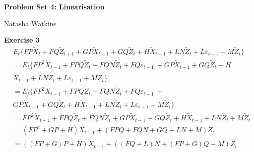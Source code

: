 \documentclass[letterpaper,12pt]{article}
\begin{document}
\textbf{\large Problem Set 4: Linearisation}

Natasha Watkins

\vspace{5mm}

\textbf{Exercise 3}
\begin{align*}
& E_t \Big\{ F P \tilde{X}_t + F Q \tilde{Z}_{t+1} + G P \tilde{X}_{t-1} + G Q \tilde{Z}_t + H \tilde{X}_{t-1} + L N \tilde{Z}_t + L \varepsilon_{t+1} + M \tilde{Z}_t \Big\} \\
&= E_t \Big\{ F P^2 \tilde{X}_{t-1} + F P Q \tilde{Z}_t + F Q N \tilde{Z}_t + F Q \varepsilon_{t+1} \ + 
G P \tilde{X}_{t-1} + G Q \tilde{Z}_t + H \\ & \tilde{X}_{t-1} + LN \tilde{Z}_t + L\varepsilon_{t+1} + M \tilde{Z}_t \Big\} \\
&= E_t \Big\{ F P^2 \tilde{X}_{t-1} + F P Q \tilde{Z}_t + F Q N \tilde{Z}_t + F Q \varepsilon_{t+1} \ +  \\ & 
G P \tilde{X}_{t-1} + G Q \tilde{Z}_t + H \tilde{X}_{t-1} + LN \tilde{Z}_t + L\varepsilon_{t+1} + M\tilde{Z}_t \Big\} \\
&= F P^2 \tilde{X}_{t-1} + F P Q \tilde{Z}_t + F Q N \tilde{Z}_t + 
G P \tilde{X}_{t-1} + G Q \tilde{Z}_t + H \tilde{X}_{t-1} + LN \tilde{Z}_t + M\tilde{Z}_t \\
&= (F P^2 + GP + H) \tilde{X}_{t-1} + (F P Q + F Q N + G Q + LN + M) \tilde{Z}_t \\
&= ((F P + G)P + H) \tilde{X}_{t-1} + ((FQ + L)N + (FP + G)Q + M) \tilde{Z}_t \\
\end{align*}
\end{document}
